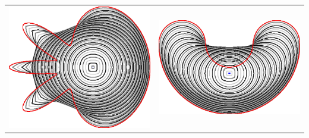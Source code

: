 \begin{frame}
{\begin{tabular}{cc}
\includegraphics[scale=0.12]{figures/graphcut/no-neighborhood-flow/flower.png}\hspace{3em} &
\includegraphics[scale=0.12]{figures/graphcut/no-neighborhood-flow/bean.png}
\end{tabular}}
\end{frame}

